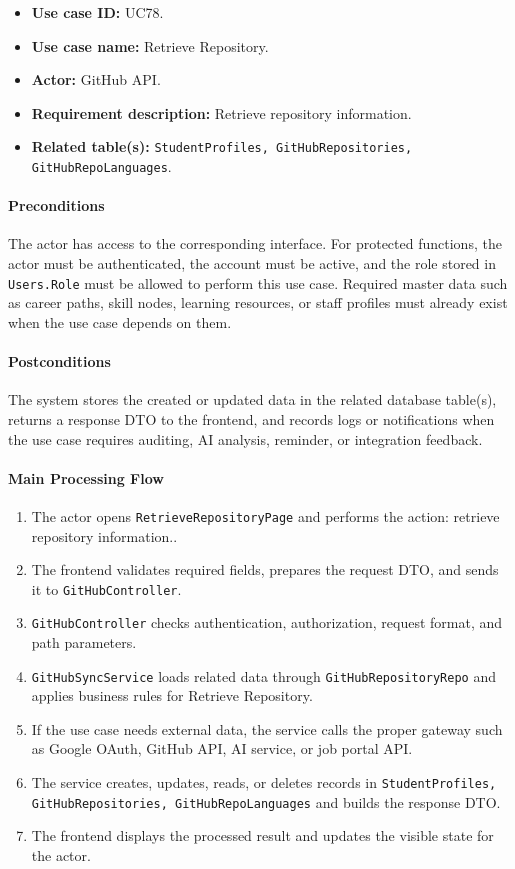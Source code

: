 \begin{itemize}
    \item \textbf{Use case ID:} UC78.
    \item \textbf{Use case name:} Retrieve Repository.
    \item \textbf{Actor:} GitHub API.
    \item \textbf{Requirement description:} Retrieve repository information.
    \item \textbf{Related table(s):} \texttt{StudentProfiles, GitHubRepositories, GitHubRepoLanguages}.
\end{itemize}

\paragraph{Preconditions}

The actor has access to the corresponding interface. For protected functions, the actor must be authenticated, the account must be active, and the role stored in \texttt{Users.Role} must be allowed to perform this use case. Required master data such as career paths, skill nodes, learning resources, or staff profiles must already exist when the use case depends on them.

\paragraph{Postconditions}

The system stores the created or updated data in the related database table(s), returns a response DTO to the frontend, and records logs or notifications when the use case requires auditing, AI analysis, reminder, or integration feedback.

\paragraph{Main Processing Flow}

\begin{enumerate}
    \item The actor opens \texttt{RetrieveRepositoryPage} and performs the action: retrieve repository information..
    \item The frontend validates required fields, prepares the request DTO, and sends it to \texttt{GitHubController}.
    \item \texttt{GitHubController} checks authentication, authorization, request format, and path parameters.
    \item \texttt{GitHubSyncService} loads related data through \texttt{GitHubRepositoryRepo} and applies business rules for Retrieve Repository.
    \item If the use case needs external data, the service calls the proper gateway such as Google OAuth, GitHub API, AI service, or job portal API.
    \item The service creates, updates, reads, or deletes records in \texttt{StudentProfiles, GitHubRepositories, GitHubRepoLanguages} and builds the response DTO.
    \item The frontend displays the processed result and updates the visible state for the actor.
\end{enumerate}

